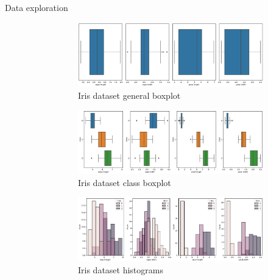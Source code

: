 \begin{description}
    \item[Data exploration] 
        \begin{figure}[H]
            \begin{subfigure}{.5\textwidth}
                \centering
                \includegraphics[width=\linewidth]{img/_iris_boxplot_general.pdf}
                \caption{Iris dataset general boxplot}
            \end{subfigure}%
            \begin{subfigure}{.5\textwidth}
                \centering
                \includegraphics[width=\linewidth]{img/_iris_boxplot_inside.pdf}
                \caption{Iris dataset class boxplot}
            \end{subfigure}
            \begin{subfigure}{.5\textwidth}
                \centering
                \includegraphics[width=\linewidth]{img/_iris_histogram.pdf}
                \caption{Iris dataset histograms}
            \end{subfigure}%
            \begin{subfigure}{.5\textwidth}

\end{subfigure}
\end{figure}
\end{description}
